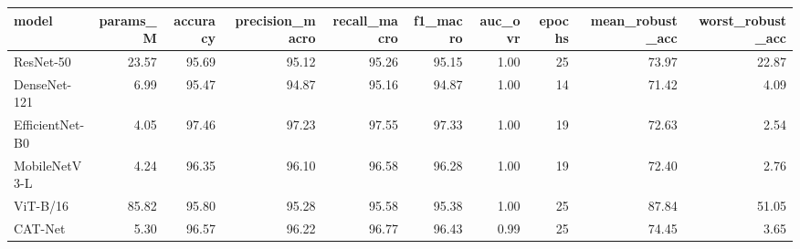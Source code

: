 \begin{tabular}{lrrrrrrrrr}
\toprule
model & params_M & accuracy & precision_macro & recall_macro & f1_macro & auc_ovr & epochs & mean_robust_acc & worst_robust_acc \\
\midrule
ResNet-50 & 23.57 & 95.69 & 95.12 & 95.26 & 95.15 & 1.00 & 25 & 73.97 & 22.87 \\
DenseNet-121 & 6.99 & 95.47 & 94.87 & 95.16 & 94.87 & 1.00 & 14 & 71.42 & 4.09 \\
EfficientNet-B0 & 4.05 & 97.46 & 97.23 & 97.55 & 97.33 & 1.00 & 19 & 72.63 & 2.54 \\
MobileNetV3-L & 4.24 & 96.35 & 96.10 & 96.58 & 96.28 & 1.00 & 19 & 72.40 & 2.76 \\
ViT-B/16 & 85.82 & 95.80 & 95.28 & 95.58 & 95.38 & 1.00 & 25 & 87.84 & 51.05 \\
CAT-Net & 5.30 & 96.57 & 96.22 & 96.77 & 96.43 & 0.99 & 25 & 74.45 & 3.65 \\
\bottomrule
\end{tabular}
